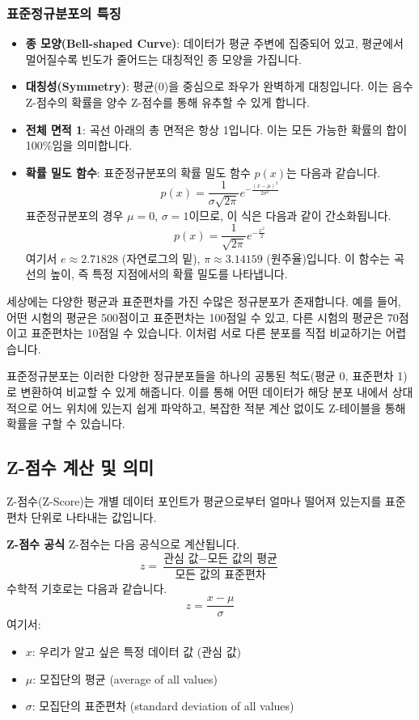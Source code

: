 \documentclass[11pt,a4paper]{article}
\theoremstyle{definition}
\begin{document}
\subsubsection*{표준정규분포의 특징}
\begin{itemize}
    \item \textbf{종 모양(Bell-shaped Curve)}: 데이터가 평균 주변에 집중되어 있고, 평균에서 멀어질수록 빈도가 줄어드는 대칭적인 종 모양을 가집니다.
    \item \textbf{대칭성(Symmetry)}: 평균(0)을 중심으로 좌우가 완벽하게 대칭입니다. 이는 음수 Z-점수의 확률을 양수 Z-점수를 통해 유추할 수 있게 합니다.
    \item \textbf{전체 면적 1}: 곡선 아래의 총 면적은 항상 1입니다. 이는 모든 가능한 확률의 합이 100\%임을 의미합니다.
    \item \textbf{확률 밀도 함수}: 표준정규분포의 확률 밀도 함수 $p(x)$는 다음과 같습니다.
    \[ p(x) = \frac{1}{\sigma\sqrt{2\pi}} e^{-\frac{(x-\mu)^2}{2\sigma^2}} \]
    표준정규분포의 경우 $\mu=0$, $\sigma=1$이므로, 이 식은 다음과 같이 간소화됩니다.
    \[ p(x) = \frac{1}{\sqrt{2\pi}} e^{-\frac{x^2}{2}} \]
    여기서 $e \approx 2.71828$ (자연로그의 밑), $\pi \approx 3.14159$ (원주율)입니다. 이 함수는 곡선의 높이, 즉 특정 지점에서의 확률 밀도를 나타냅니다.
\end{itemize}

\begin{tcolorbox}[title=\textbf{왜 표준정규분포가 필요한가?}, colback=lightgray, colframe=black!75]
세상에는 다양한 평균과 표준편차를 가진 수많은 정규분포가 존재합니다. 예를 들어, 어떤 시험의 평균은 500점이고 표준편차는 100점일 수 있고, 다른 시험의 평균은 70점이고 표준편차는 10점일 수 있습니다. 이처럼 서로 다른 분포를 직접 비교하기는 어렵습니다.

표준정규분포는 이러한 다양한 정규분포들을 하나의 공통된 척도(평균 0, 표준편차 1)로 변환하여 비교할 수 있게 해줍니다. 이를 통해 어떤 데이터가 해당 분포 내에서 상대적으로 어느 위치에 있는지 쉽게 파악하고, 복잡한 적분 계산 없이도 Z-테이블을 통해 확률을 구할 수 있습니다.
\end{tcolorbox}

\subsection{Z-점수 계산 및 의미}
Z-점수(Z-Score)는 개별 데이터 포인트가 평균으로부터 얼마나 떨어져 있는지를 표준편차 단위로 나타내는 값입니다.

\begin{definitionbox}
\textbf{Z-점수 공식}
Z-점수는 다음 공식으로 계산됩니다.
\[ z = \frac{\text{관심 값} - \text{모든 값의 평균}}{\text{모든 값의 표준편차}} \]
수학적 기호로는 다음과 같습니다.
\[ z = \frac{x - \mu}{\sigma} \]
여기서:
\begin{itemize}
    \item $x$: 우리가 알고 싶은 특정 데이터 값 (관심 값)
    \item $\mu$: 모집단의 평균 (average of all values)
    \item $\sigma$: 모집단의 표준편차 (standard deviation of all values)
\end{itemize}
\end{definitionbox}
\end{document}

